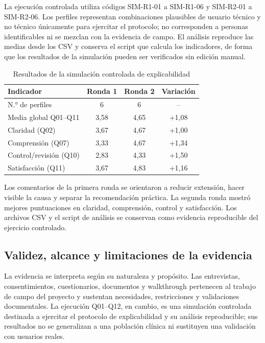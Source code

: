\documentclass[12pt,a4paper]{article}
\begin{document}
La ejecución controlada utiliza códigos SIM-R1-01 a SIM-R1-06 y SIM-R2-01 a SIM-R2-06. Los perfiles representan combinaciones plausibles de usuario técnico y no técnico únicamente para ejercitar el protocolo; no corresponden a personas identificables ni se mezclan con la evidencia de campo. El análisis reproduce las medias desde los CSV y conserva el script que calcula los indicadores, de forma que los resultados de la simulación pueden ser verificados sin edición manual.


\begin{table}[H]\centering\caption{Resultados de la simulación controlada de explicabilidad}
\begin{tabular}{lccc}\toprule
\textbf{Indicador}&\textbf{Ronda 1}&\textbf{Ronda 2}&\textbf{Variación}\\\midrule
N.° de perfiles&6&6&--\\
Media global Q01--Q11&3,58&4,65&+1,08\\
Claridad (Q02)&3,67&4,67&+1,00\\
Comprensión (Q07)&3,33&4,67&+1,34\\
Control/revisión (Q10)&2,83&4,33&+1,50\\
Satisfacción (Q11)&3,67&4,83&+1,16\\\bottomrule
\end{tabular}\end{table}

Los comentarios de la primera ronda se orientaron a reducir extensión, hacer visible la causa y separar la recomendación práctica. La segunda ronda mostró mejores puntuaciones en claridad, comprensión, control y satisfacción. Los archivos CSV y el script de análisis se conservan como evidencia reproducible del ejercicio controlado.


\subsection{Validez, alcance y limitaciones de la evidencia}
La evidencia se interpreta según su naturaleza y propósito. Las entrevistas, consentimientos, cuestionarios, documentos y walkthrough pertenecen al trabajo de campo del proyecto y sustentan necesidades, restricciones y validaciones documentales. La ejecución Q01--Q12, en cambio, es una simulación controlada destinada a ejercitar el protocolo de explicabilidad y su análisis reproducible; sus resultados no se generalizan a una población clínica ni sustituyen una validación con usuarios reales.
\end{document}
